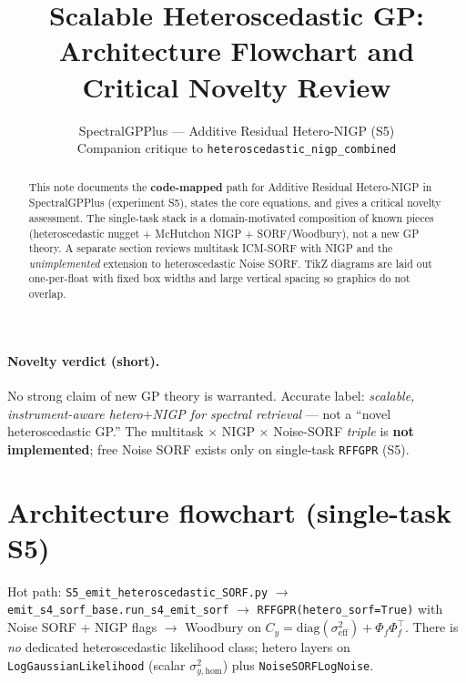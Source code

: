 \documentclass[11pt]{article}
\title{Scalable Heteroscedastic GP:\\[0.25em]
\large Architecture Flowchart and Critical Novelty Review}
\author{SpectralGPPlus --- Additive Residual Hetero-NIGP (S5)\\
\small Companion critique to \texttt{heteroscedastic\_nigp\_combined}}
\date{}
\newcommand{\sigyhom}{\sigma_{y,\mathrm{hom}}^{2}}
\newcommand{\sigeff}{\sigma_{\mathrm{eff}}^{2}}
\newcommand{\Phif}{\Phi_{f}}
\newcommand{\Cy}{C_{y}}
\begin{document}
\maketitle

\begin{abstract}
\noindent
This note documents the \textbf{code-mapped} path for Additive Residual
Hetero-NIGP in SpectralGPPlus (experiment S5), states the core equations,
and gives a critical novelty assessment.
The single-task stack is a domain-motivated composition of known pieces
(heteroscedastic nugget + McHutchon NIGP + SORF/Woodbury), not a new GP theory.
A separate section reviews multitask ICM-SORF with NIGP and the
\emph{unimplemented} extension to heteroscedastic Noise SORF.
TikZ diagrams are laid out one-per-float with fixed box widths and large
vertical spacing so graphics do not overlap.
\end{abstract}

\paragraph{Novelty verdict (short).}
No strong claim of new GP theory is warranted.
Accurate label: \emph{scalable, instrument-aware hetero$+$NIGP for spectral
retrieval} --- not a ``novel heteroscedastic GP.''
The multitask $\times$ NIGP $\times$ Noise-SORF \emph{triple} is
\textbf{not implemented}; free Noise SORF exists only on single-task
\texttt{RFFGPR} (S5).

\FloatBarrier
\section{Architecture flowchart (single-task S5)}
\label{sec:arch}

Hot path:
\texttt{S5\_emit\_heteroscedastic\_SORF.py}
$\to$
\texttt{emit\_s4\_sorf\_base.run\_s4\_emit\_sorf}
$\to$
\texttt{RFFGPR(hetero\_sorf=True)}
with Noise SORF + NIGP flags
$\to$ Woodbury on $\Cy=\mathrm{diag}(\sigeff)+\Phif\Phif^{\top}$.
There is \emph{no} dedicated heteroscedastic likelihood class; hetero layers on
\texttt{LogGaussianLikelihood} (scalar $\sigyhom$) plus
\texttt{NoiseSORFLogNoise}.

\end{document}
